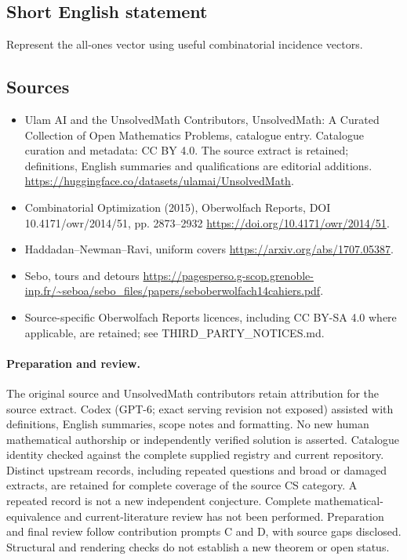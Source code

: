 \documentclass[11pt]{article}
\begin{document}
\subsection{Short English statement}
Represent the all-ones vector using useful combinatorial incidence vectors.
\subsection{Sources}
\begin{itemize}
\item[\hypertarget{source:statement:1}{S1}] Ulam AI and the UnsolvedMath Contributors, UnsolvedMath: A Curated Collection of Open Mathematics Problems, catalogue entry. Catalogue curation and metadata: CC BY 4.0. The source extract is retained; definitions, English summaries and qualifications are editorial additions.
\url{https://huggingface.co/datasets/ulamai/UnsolvedMath}.
\item[\hypertarget{source:statement:2}{S2}] Combinatorial Optimization (2015), Oberwolfach Reports, DOI 10.4171/owr/2014/51, pp. 2873--2932
\url{https://doi.org/10.4171/owr/2014/51}.
\item[\hypertarget{source:statement:3}{S3}] Haddadan--Newman--Ravi, uniform covers
\url{https://arxiv.org/abs/1707.05387}.
\item[\hypertarget{source:statement:4}{S4}] Sebo, tours and detours
\url{https://pagesperso.g-scop.grenoble-inp.fr/~seboa/sebo_files/papers/seboberwolfach14cahiers.pdf}.
\item Source-specific Oberwolfach Reports licences, including CC BY-SA 4.0 where applicable, are retained; see THIRD\_PARTY\_NOTICES.md.
\end{itemize}
\paragraph{Preparation and review.}
The original source and UnsolvedMath contributors retain attribution for the source extract. Codex (GPT-6; exact serving revision not exposed) assisted with definitions, English summaries, scope notes and formatting. No new human mathematical authorship or independently verified solution is asserted. Catalogue identity checked against the complete supplied registry and current repository. Distinct upstream records, including repeated questions and broad or damaged extracts, are retained for complete coverage of the source CS category. A repeated record is not a new independent conjecture. Complete mathematical-equivalence and current-literature review has not been performed. Preparation and final review follow contribution prompts C and D, with source gaps disclosed. Structural and rendering checks do not establish a new theorem or open status.
\label{end:statement}
\end{document}
